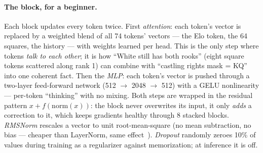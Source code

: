 \documentclass[10pt,a4paper]{article}
\begin{document}
\paragraph{The block, for a beginner.} Each block updates every token
twice. First \emph{attention}: each token's vector is replaced by a
weighted blend of all 74 tokens' vectors --- the Elo token, the 64
squares, the history --- with weights learned per head. This is the only
step where tokens \emph{talk to each other}; it is how ``White still has
both rooks'' (eight square tokens scattered along rank 1) can combine
with ``castling rights mask = KQ'' into one coherent fact. Then the
\emph{MLP}: each token's vector is pushed through a two-layer
feed-forward network (512 $\rightarrow$ 2048 $\rightarrow$ 512) with a
GELU nonlinearity --- per-token ``thinking'' with no mixing. Both steps
are wrapped in the residual pattern $x + f(\mathrm{norm}(x))$:
the block never overwrites its input, it only \emph{adds} a correction to
it, which keeps gradients healthy through 8 stacked blocks.
\emph{RMSNorm} rescales a vector to unit root-mean-square (no mean
subtraction, no bias --- cheaper than LayerNorm, same effect~\cite{rmsnorm}).
\emph{Dropout} randomly zeroes 10\% of values during training as a
regularizer against memorization; at inference it is off.
\end{document}
